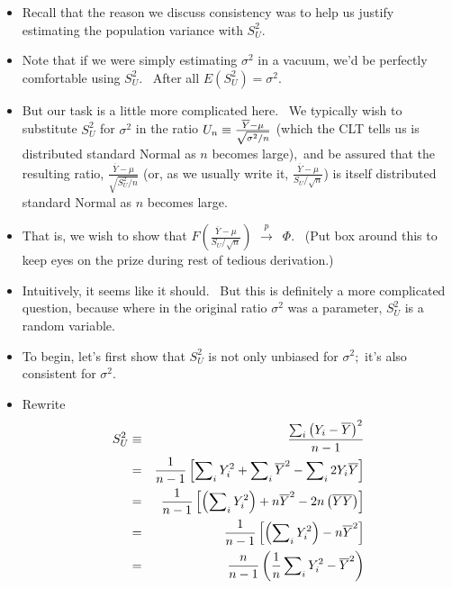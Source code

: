 \documentclass[11pt]{article}
\begin{document}
\begin{itemize}
\item Recall that the reason we discuss consistency was to help us justify
estimating the population variance with $S_{U}^{2}.$

\item Note that if we were simply estimating $\sigma ^{2}$ in a vacuum, we'd
be perfectly comfortable using $S_{U}^{2}.$ \ After all $E\left(
S_{U}^{2}\right) =\sigma ^{2}.$ \ 

\item But our task is a little more complicated here. \ We typically wish to
substitute $S_{U}^{2}$ for $\sigma ^{2}$ in the ratio $U_{n}\equiv \frac{%
\overline{Y}-\mu }{\sqrt{\sigma ^{2}/n}}$ (which the CLT tells us is
distributed standard Normal as $n$ becomes large)$,$ and be assured that the
resulting ratio, $\frac{\overline{Y}-\mu }{\sqrt{S_{U}^{2}/n}}$ (or, as we
usually write it, $\frac{\overline{Y}-\mu }{S_{U}/\sqrt{n}}$) is itself
distributed standard Normal as $n$ becomes large.

\item That is, we wish to show that $F\left( \frac{\overline{Y}-\mu }{S_{U}/%
\sqrt{n}}\right) $ $\overset{p}{\rightarrow }$\ $\Phi .$ \ (Put box around
this to keep eyes on the prize during rest of tedious derivation.)

\item Intuitively, it seems like it should. \ But this is definitely a more
complicated question, because where in the original ratio $\sigma ^{2}$ was
a parameter, $S_{U}^{2}$ is a random variable.

\item To begin, let's first show that $S_{U}^{2}$ is not only unbiased for $%
\sigma ^{2};$ it's also consistent for $\sigma ^{2}.$

\item Rewrite%
\begin{eqnarray*}
S_{U}^{2} &\equiv &\frac{\sum\nolimits_{i}\left( Y_{i}-\overline{Y}\right)
^{2}}{n-1} \\
&=&\frac{1}{n-1}\left[ \sum\nolimits_{i}Y_{i}^{2}+\sum\nolimits_{i}\overline{%
Y}^{2}-\sum\nolimits_{i}2Y_{i}\overline{Y}\right] \\
&=&\frac{1}{n-1}\left[ \left( \sum\nolimits_{i}Y_{i}^{2}\right) +n\overline{Y%
}^{2}-2n\left( \overline{Y}\overline{Y}\right) \right] \\
&=&\frac{1}{n-1}\left[ \left( \sum\nolimits_{i}Y_{i}^{2}\right) -n\overline{Y%
}^{2}\right] \\
&=&\frac{n}{n-1}\left( \frac{1}{n}\sum\nolimits_{i}Y_{i}^{2}-\overline{Y}%
^{2}\right)
\end{eqnarray*}


\end{itemize}
\end{document}
